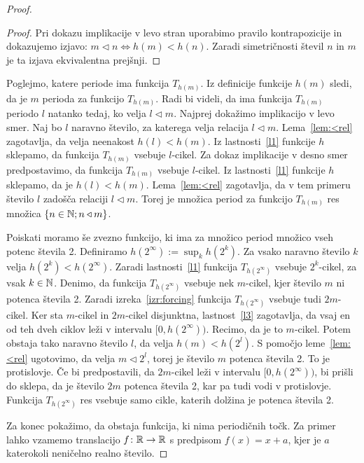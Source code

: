 \documentclass[../TG_magistrsko_delo_sections.tex]{subfiles}
\begin{document}
\begin{proof}
\begin{proof}
Pri dokazu implikacije v levo stran uporabimo pravilo kontrapozicije in dokazujemo izjavo: $ m \triangleleft n \iff h(m) < h(n)$. Zaradi simetričnosti števil $n$ in $m$ je ta izjava ekvivalentna prejšnji.
\end{proof}
Poglejmo, katere periode ima funkcija $T_{h(m)}$. Iz definicije funkcije $h(m)$ sledi, da je $m$ perioda za funkcijo $T_{h(m)}$. Radi bi videli, da ima funkcija $T_{h(m)}$ periodo $l$ natanko tedaj, ko velja $l \triangleleft m$. Najprej dokažimo implikacijo v levo smer. Naj bo $l$ naravno število, za katerega velja relacija $l \triangleleft m$. Lema~\ref{lem:<rel} zagotavlja, da velja neenakost $h(l) < h(m)$. Iz lastnosti~\ref{l1} funkcije $h$ sklepamo, da funkcija $T_{h(m)}$ vsebuje $l$-cikel. Za dokaz implikacije v desno smer predpostavimo, da funkcija $T_{h(m)}$ vsebuje $l$-cikel. Iz lastnosti~\ref{l1} funkcije $h$ sklepamo, da je $h(l) < h(m)$. Lema~\ref{lem:<rel} zagotavlja, da v tem primeru število $l$ zadošča relaciji $l \triangleleft m$. Torej je množica period za funkcijo $T_{h(m)}$ res množica $\{n \in \mathbb N; n \triangleleft m\}$.

Poiskati moramo še zvezno funkcijo, ki ima za množico period množico vseh potenc števila 2. Definiramo $h(2^{\infty}) := \sup_k h(2^k)$. Za vsako naravno število $k$ velja $h(2^k) < h(2^{\infty})$. Zaradi lastnosti~\ref{l1} funkcija $T_{h(2^{\infty})}$ vsebuje $2^k$-cikel, za vsak $k \in \mathbb N$. 
Denimo, da funkcija $T_{h(2^{\infty})}$ vsebuje nek $m$-cikel, kjer število $m$ ni potenca števila 2. Zaradi izreka~\ref{izr:forcing} funkcija $T_{h(2^{\infty})}$ vsebuje tudi $2m$-cikel. Ker sta $m$-cikel in $2m$-cikel disjunktna, lastnost~\ref{l3} zagotavlja, da vsaj en od teh dveh ciklov leži v intervalu $[0, h(2^{\infty}))$. Recimo, da je to $m$-cikel. Potem obstaja tako naravno število $l$, da velja $h(m) < h(2^l)$. S pomočjo leme~\ref{lem:<rel} ugotovimo, da velja $m \triangleleft 2^l$, torej je število $m$ potenca števila 2. To je protislovje. Če bi predpostavili, da $2m$-cikel leži v intervalu $[0, h(2^{\infty}))$, bi prišli do sklepa, da je število $2m$ potenca števila 2, kar pa tudi vodi v protislovje. Funkcija $T_{h(2^{\infty})}$ res vsebuje samo cikle, katerih dolžina je potenca števila 2.

Za konec pokažimo, da obstaja funkcija, ki nima periodičnih točk. Za primer lahko vzamemo translacijo $f\colon \mathbb R \to \mathbb R$ s predpisom $f(x) = x + a$, kjer je $a$ katerokoli neničelno realno število.
\end{proof}
\end{document}
